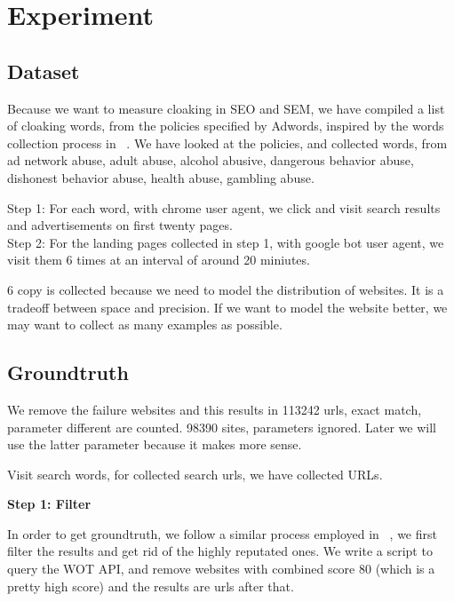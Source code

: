 \section{Experiment}
\label{s:experiment}



\subsection{Dataset}


Because we want to measure cloaking in SEO and SEM, we have compiled a list of
cloaking words, from the policies specified by Adwords, inspired by the words
collection process in ~\cite{wang2011cloak}. We have looked at the policies, and
collected  words, from ad network abuse, adult abuse, alcohol abusive, dangerous behavior
abuse, dishonest behavior abuse, health abuse, gambling abuse.

Step 1: For each word, with chrome user agent, we click and visit search results and advertisements on first
twenty pages. \\
Step 2: For the landing pages collected in step 1, with google bot user agent, we visit them 6 times at an
interval of around 20 miniutes.

6 copy is collected because we need to model the distribution of websites. It is
a tradeoff between space and precision. If we want to model the website better,
we may want to collect as many examples as possible.


\subsection{Groundtruth}

We remove the failure websites and this results in 
113242 urls, exact match, parameter different are counted.
98390 sites, parameters ignored. Later we will use the latter parameter because
it makes more sense.


Visit  search words, for collected search urls, we have collected
 URLs.


\bf{Step 1: Filter}

In order to get groundtruth, we follow a similar process employed in
~\cite{lin2009detection}, we first filter the results and get rid of the highly reputated ones. We write a
script to query the WOT API, and remove websites with combined score 80
(which is a pretty high score) and the results are  urls after that.

